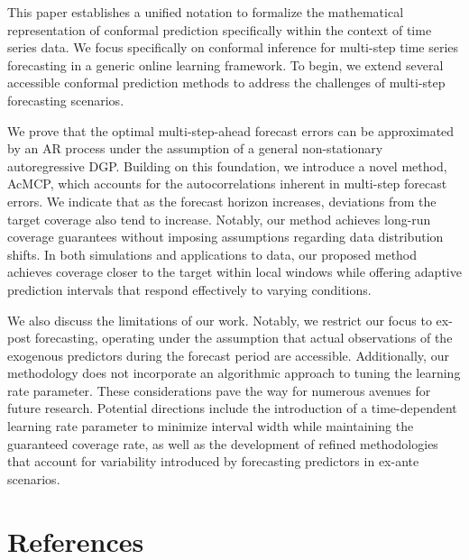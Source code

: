 \documentclass[
  11pt,
  a4paper,
]{article}
\theoremstyle{plain}
\theoremstyle{remark}
\begin{document}
This paper establishes a unified notation to formalize the mathematical
representation of conformal prediction specifically within the context
of time series data. We focus specifically on conformal inference for
multi-step time series forecasting in a generic online learning
framework. To begin, we extend several accessible conformal prediction
methods to address the challenges of multi-step forecasting scenarios.

We prove that the optimal multi-step-ahead forecast errors can be
approximated by an AR process under the assumption of a general
non-stationary autoregressive DGP. Building on this foundation, we
introduce a novel method, AcMCP, which accounts for the autocorrelations
inherent in multi-step forecast errors. We indicate that as the forecast
horizon increases, deviations from the target coverage also tend to
increase. Notably, our method achieves long-run coverage guarantees
without imposing assumptions regarding data distribution shifts. In both
simulations and applications to data, our proposed method achieves
coverage closer to the target within local windows while offering
adaptive prediction intervals that respond effectively to varying
conditions.

We also discuss the limitations of our work. Notably, we restrict our
focus to ex-post forecasting, operating under the assumption that actual
observations of the exogenous predictors during the forecast period are
accessible. Additionally, our methodology does not incorporate an
algorithmic approach to tuning the learning rate parameter. These
considerations pave the way for numerous avenues for future research.
Potential directions include the introduction of a time-dependent
learning rate parameter to minimize interval width while maintaining the
guaranteed coverage rate, as well as the development of refined
methodologies that account for variability introduced by forecasting
predictors in ex-ante scenarios.

\section*{References}\label{references}

\printbibliography[heading=none]

\newpage
\appendix
\setcounter{section}{0}
\renewcommand{\thesection}{Appendix \Alph{section}}
\renewcommand{\thesubsection}{\Alph{section}.\arabic{subsection}}
\renewcommand{\thefigure}{A\arabic{figure}}
\renewcommand{\thetable}{A\arabic{table}}
\setcounter{figure}{0}
\setcounter{table}{0}
\end{document}
